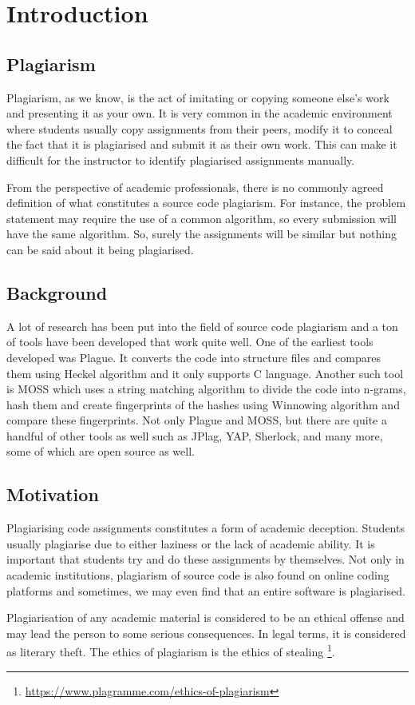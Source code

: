 \documentclass[12pt]{article}
\begin{document}
\pagebreak

\section{Introduction}
\subsection{Plagiarism}
Plagiarism, as we know, is the act of imitating or copying someone else's work and presenting it as your own. It is very common in the academic environment where students usually copy assignments from their peers, modify it to conceal the fact that it is plagiarised and submit it as their own work. This can make it difficult for the instructor to identify plagiarised assignments manually. \par
From the perspective of academic professionals, there is no commonly agreed definition of what constitutes a source code plagiarism. For instance, the problem statement may require the use of a common algorithm, so every submission will have the same algorithm. So, surely the assignments will be similar but nothing can be said about it being plagiarised. \par

\subsection{Background}
A lot of research has been put into the field of source code plagiarism and a ton of tools have been developed that work quite well. One of the earliest tools developed was Plague. It converts the code into structure files and compares them using Heckel algorithm and it only supports C language. Another such tool is MOSS which uses a string matching algorithm to divide the code into n-grams, hash them and create fingerprints of the hashes using Winnowing algorithm and compare these fingerprints. Not only Plague and MOSS, but there are quite a handful of other tools as well such as JPlag, YAP, Sherlock, and many more, some of which are open source as well.


\subsection{Motivation}
Plagiarising code assignments constitutes a form of academic deception. Students usually plagiarise due to either laziness or the lack of academic ability. It is important that students try and do these assignments by themselves. Not only in academic institutions, plagiarism of source code is also found on online coding platforms and sometimes, we may even find that an entire software is plagiarised. \par
Plagiarisation of any academic material is considered to be an ethical offense and may lead the person to some serious consequences. In legal terms, it is considered as literary theft. The ethics of plagiarism is the ethics of stealing  \footnote{\url{https://www.plagramme.com/ethics-of-plagiarism}}.
\end{document}
